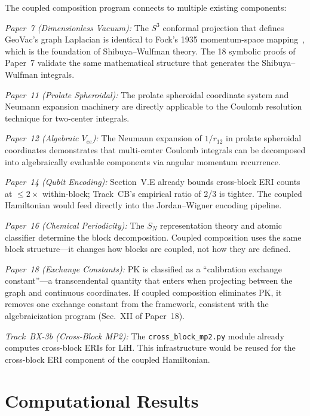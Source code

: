 \documentclass[aps,pra,twocolumn,superscriptaddress,longbibliography]{revtex4-2}
\begin{document}
The coupled composition program connects to multiple existing
components:

\emph{Paper~7 (Dimensionless Vacuum):} The $S^3$ conformal projection
that defines GeoVac's graph Laplacian is identical to Fock's
1935 momentum-space mapping~\cite{fock1935}, which is the foundation
of Shibuya--Wulfman theory.  The 18 symbolic proofs of Paper~7
validate the same mathematical structure that generates the
Shibuya--Wulfman integrals.

\emph{Paper~11 (Prolate Spheroidal):} The prolate spheroidal
coordinate system and Neumann expansion machinery are directly
applicable to the Coulomb resolution technique for two-center
integrals.

\emph{Paper~12 (Algebraic $V_{ee}$):} The Neumann expansion of
$1/r_{12}$ in prolate spheroidal coordinates demonstrates that
multi-center Coulomb integrals can be decomposed into algebraically
evaluable components via angular momentum recurrence.

\emph{Paper~14 (Qubit Encoding):} Section~V.E already bounds
cross-block ERI counts at $\le 2\times$ within-block; Track~CB's
empirical ratio of 2/3 is tighter.  The coupled Hamiltonian would
feed directly into the Jordan--Wigner encoding pipeline.

\emph{Paper~16 (Chemical Periodicity):} The $S_N$ representation
theory and atomic classifier determine the block decomposition.
Coupled composition uses the same block structure---it changes how
blocks are coupled, not how they are defined.

\emph{Paper~18 (Exchange Constants):} PK is classified as a
``calibration exchange constant''---a transcendental quantity that
enters when projecting between the graph and continuous coordinates.
If coupled composition eliminates PK, it removes one exchange constant
from the framework, consistent with the algebraicization program
(Sec.~XII of Paper~18).

\emph{Track~BX-3b (Cross-Block MP2):} The \texttt{cross\_block\_mp2.py}
module already computes cross-block ERIs for LiH.  This infrastructure
would be reused for the cross-block ERI component of the coupled
Hamiltonian.


\section{Computational Results}
\label{sec:results}
\end{document}
